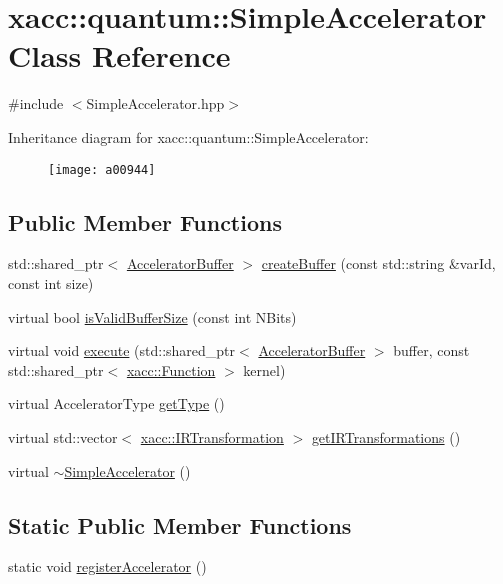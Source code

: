 \hypertarget{a00944}{}\section{xacc\+:\+:quantum\+:\+:Simple\+Accelerator Class Reference}
\label{a00944}


{\ttfamily \#include $<$Simple\+Accelerator.\+hpp$>$}

Inheritance diagram for xacc\+:\+:quantum\+:\+:Simple\+Accelerator\+:\begin{figure}[H]
\begin{center}
\leavevmode
\texttt{[image: a00944]}
\end{center}
\end{figure}
\subsection*{Public Member Functions}
\begin{DoxyCompactItemize}
\item 
std\+::shared\+\_\+ptr$<$ \hyperlink{a01096}{Accelerator\+Buffer} $>$ \hyperlink{a00944_adb9393692e9f484df241aa5d014030d1}{create\+Buffer} (const std\+::string \&var\+Id, const int size)
\item 
virtual bool \hyperlink{a00944_a60b9db2d6aed235857c45413a070338e}{is\+Valid\+Buffer\+Size} (const int N\+Bits)
\item 
virtual void \hyperlink{a00944_a3089b15fbbaa83abf2941bd3b8d2d3c6}{execute} (std\+::shared\+\_\+ptr$<$ \hyperlink{a01096}{Accelerator\+Buffer} $>$ buffer, const std\+::shared\+\_\+ptr$<$ \hyperlink{a01124}{xacc\+::\+Function} $>$ kernel)
\item 
virtual Accelerator\+Type \hyperlink{a00944_ad76eeb0bbd7de21aad5bd20d20970a98}{get\+Type} ()
\item 
virtual std\+::vector$<$ \hyperlink{a01152}{xacc\+::\+I\+R\+Transformation} $>$ \hyperlink{a00944_afc49c9e7973ba6c6ff9761c36198323d}{get\+I\+R\+Transformations} ()
\item 
virtual \hyperlink{a00944_a7ff286def924fafdff2066d12858e60c}{$\sim$\+Simple\+Accelerator} ()
\end{DoxyCompactItemize}
\subsection*{Static Public Member Functions}
\begin{DoxyCompactItemize}
\item 
static void \hyperlink{a00944_a1cfa3381a56ca6f431b4722162ccb63d}{register\+Accelerator} ()
\end{DoxyCompactItemize}
